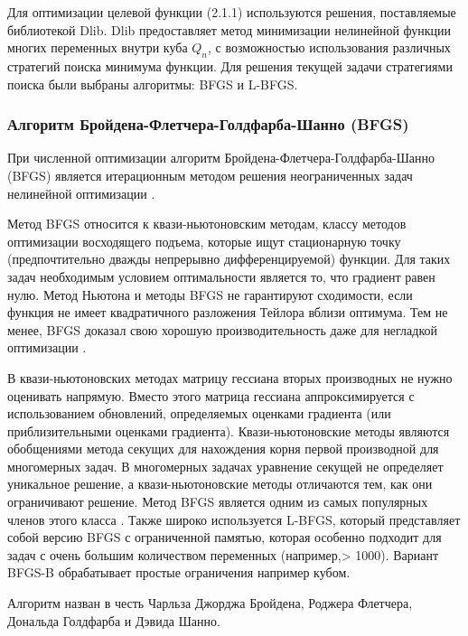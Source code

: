\documentclass[12pt, a4paper]{extarticle}
\begin{document}
Для оптимизации целевой функции (2.1.1) используются решения, поставляемые библиотекой Dlib. Dlib предоставляет метод минимизации нелинейной функции многих переменных внутри куба $Q_n$, с возможностью использования различных стратегий поиска минимума функции. Для решения текущей задачи стратегиями поиска были выбраны алгоритмы: BFGS и L-BFGS.
\subsubsection{Алгоритм Бройдена-Флетчера-Голдфарба-Шанно (BFGS)}
При численной оптимизации алгоритм Бройдена-Флетчера-Голдфарба-Шанно (BFGS) является итерационным методом решения неограниченных задач нелинейной оптимизации \cite{6}.

Метод BFGS относится к квази-ньютоновским методам, классу методов оптимизации восходящего подъема, которые ищут стационарную точку (предпочтительно дважды непрерывно дифференцируемой) функции. Для таких задач необходимым условием оптимальности является то, что градиент равен нулю. Метод Ньютона и методы BFGS не гарантируют сходимости, если функция не имеет квадратичного разложения Тейлора вблизи оптимума. Тем не менее, BFGS доказал свою хорошую производительность даже для негладкой оптимизации \cite{7}.

В квази-ньютоновских методах матрицу гессиана вторых производных не нужно оценивать напрямую. Вместо этого матрица гессиана аппроксимируется с использованием обновлений, определяемых оценками градиента (или приблизительными оценками градиента). Квази-ньютоновские методы являются обобщениями метода секущих для нахождения корня первой производной для многомерных задач. В многомерных задачах уравнение секущей не определяет уникальное решение, а квази-ньютоновские методы отличаются тем, как они ограничивают решение. Метод BFGS является одним из самых популярных членов этого класса \cite{8}. Также широко используется L-BFGS, который представляет собой версию BFGS с ограниченной памятью, которая особенно подходит для задач с очень большим количеством переменных (например,> 1000). Вариант BFGS-B \cite{9} обрабатывает простые ограничения например кубом.

Алгоритм назван в честь Чарльза Джорджа Бройдена, Роджера Флетчера, Дональда Голдфарба и Дэвида Шанно.
\end{document}
